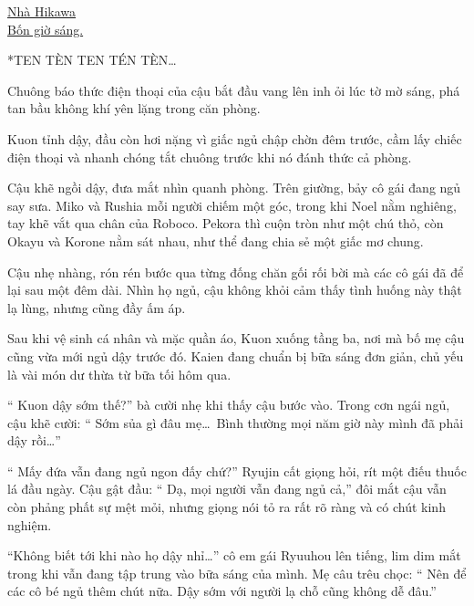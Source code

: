 \documentclass[../main.tex]{subfiles}
\begin{document}
\begin{center}
    \uline{Nhà Hikawa\\Bốn giờ sáng.}
\end{center}

*TEN TÈN TEN TÉN TÈN\dots*

Chuông báo thức điện thoại của cậu bắt đầu vang lên inh ỏi lúc tờ mờ sáng, phá tan bầu không khí yên lặng trong căn phòng.

Kuon tỉnh dậy, đầu còn hơi nặng vì giấc ngủ chập chờn đêm trước, cầm lấy chiếc điện thoại và nhanh chóng tắt chuông trước khi nó đánh thức cả phòng.

Cậu khẽ ngồi dậy, đưa mắt nhìn quanh phòng. Trên giường, bảy cô gái đang ngủ say sưa. Miko và Rushia mỗi người chiếm một góc, trong khi Noel nằm nghiêng, tay khẽ vắt qua chân của Roboco. Pekora thì cuộn tròn như một chú thỏ, còn Okayu và Korone nằm sát nhau, như thể đang chia sẻ một giấc mơ chung.

Cậu nhẹ nhàng, rón rén bước qua từng đống chăn gối rối bời mà các cô gái đã để lại sau một đêm dài. Nhìn họ ngủ, cậu không khỏi cảm thấy tình huống này thật lạ lùng, nhưng cũng đầy ấm áp.

Sau khi vệ sinh cá nhân và mặc quần áo, Kuon xuống tầng ba, nơi mà bố mẹ cậu cũng vừa mới ngủ dậy trước đó. Kaien đang chuẩn bị bữa sáng đơn giản, chủ yếu là vài món dư thừa từ bữa tối hôm qua.

``{\color{red} Kuon dậy sớm thế?}'' bà cười nhẹ khi thấy cậu bước vào. Trong cơn ngái ngủ, cậu khẽ cười: ``{\color{red} Sớm sủa gì đâu mẹ\dots\ Bình thường mọi năm giờ này mình đã phải dậy rồi\dots}''

``{\color{red} Mấy đứa vẫn đang ngủ ngon đấy chứ?}'' Ryujin cất giọng hỏi, rít một điếu thuốc lá đầu ngày. Cậu gật đầu: ``{\color{red} Dạ, mọi người vẫn đang ngủ cả,}'' đôi mắt cậu vẫn còn phảng phất sự mệt mỏi, nhưng giọng nói tỏ ra rất rõ ràng và có chút kinh nghiệm.

``{\color{red}Không biết tới khi nào họ dậy nhỉ\dots}'' cô em gái Ryuuhou lên tiếng, lim dim mắt trong khi vẫn đang tập trung vào bữa sáng của mình. Mẹ câu trêu chọc: ``{\color{red} Nên để các cô bé ngủ thêm chút nữa. Dậy sớm với người lạ chỗ cũng không dễ đâu.}''
\end{document}
